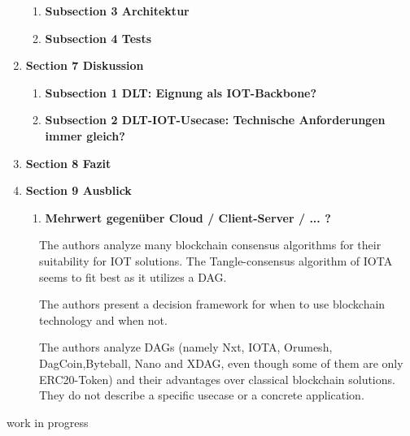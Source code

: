 \documentclass[
    ngerman,american
    ]{scrartcl}
\newcommand{\lang}{en}
\begin{document}
\begin{enumerate}
\begin{enumerate}
                        \item \textbf{Subsection 3 Architektur}
                        \item \textbf{Subsection 4 Tests}
                    \end{enumerate}
            \item \textbf{Section 7 Diskussion}
                    \begin{enumerate}
                        \item \textbf{Subsection 1 DLT: Eignung als IOT-Backbone?}
                        \item \textbf{Subsection 2 DLT-IOT-Usecase: Technische Anforderungen immer gleich?}
                    \end{enumerate}
            \item \textbf{Section 8 Fazit}
            \item \textbf{Section 9 Ausblick}
                    \begin{enumerate}
                        \item \textbf{Mehrwert gegenüber Cloud / Client-Server / ... ?}
                    \end{enumerate}


        \end{enumerate}

        \newpage

        \sectionSource{\lang}
        \sectionSourceDescription{\lang}

        \begin{description}
          \item[\cite{DBLP:journals/corr/abs-1809-05613}] The authors analyze many blockchain consensus algorithms for their suitability for IOT solutions. The Tangle-consensus algorithm of IOTA seems to fit best as it utilizes a DAG.
          \item[\cite{iotbds18}] The authors present a decision framework for when to use blockchain technology and when not.
          \item[\cite{8632193}] The authors analyze DAGs (namely Nxt, IOTA, Orumesh, DagCoin,Byteball, Nano and XDAG, even though some of them are only ERC20-Token) and their advantages over classical blockchain solutions. They do not describe a specific usecase or a concrete application.
          \item[work in progress]
        \end{description}

        \newpage

      \printbibliography
    
\end{document}
